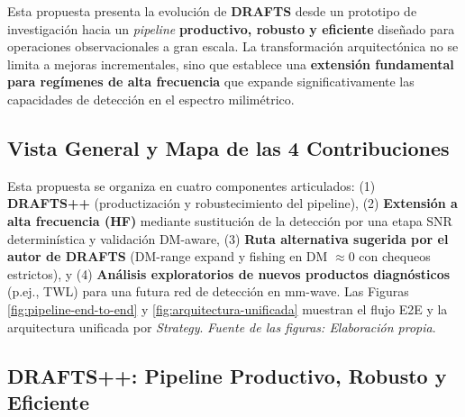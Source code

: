 


Esta propuesta presenta la evolución de \textbf{DRAFTS} \cite{zhang2024drafts} desde un prototipo de investigación hacia un \textit{pipeline} \textbf{productivo, robusto y eficiente} diseñado para operaciones observacionales a gran escala. La transformación arquitectónica no se limita a mejoras incrementales, sino que establece una \textbf{extensión fundamental para regímenes de alta frecuencia} que expande significativamente las capacidades de detección en el espectro milimétrico.

\subsection{Vista General y Mapa de las 4 Contribuciones}

Esta propuesta se organiza en cuatro componentes articulados: (1) \textbf{DRAFTS++} (productización y robustecimiento del pipeline), (2) \textbf{Extensión a alta frecuencia (HF)} mediante sustitución de la detección por una etapa SNR determinística y validación DM-aware, (3) \textbf{Ruta alternativa sugerida por el autor de DRAFTS} (DM-range expand y fishing en DM $\approx 0$ con chequeos estrictos), y (4) \textbf{Análisis exploratorios de nuevos productos diagnósticos} (p.ej., TWL) para una futura red de detección en mm-wave. Las Figuras \ref{fig:pipeline-end-to-end} y \ref{fig:arquitectura-unificada} muestran el flujo E2E y la arquitectura unificada por \emph{Strategy}. \textit{Fuente de las figuras: Elaboración propia}.

\subsection{DRAFTS++: Pipeline Productivo, Robusto y Eficiente}

